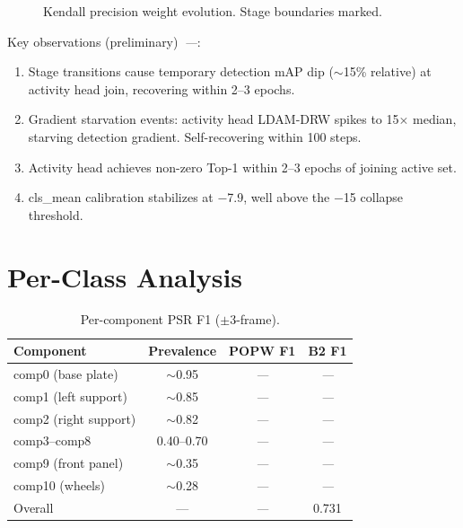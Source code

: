 \documentclass[10pt,journal,compsoc]{IEEEtran}
\newcommand{\popw}{POPW}
\newcommand{\todo}{\textit{---}}
\newcommand{\popwres}{\todo}
\begin{document}
\begin{figure}[htbp]
\centering
{}
\caption{Kendall precision weight evolution. Stage boundaries marked.}
\label{fig:kendall-evolution}
\end{figure}

Key observations (preliminary)~\popwres:
\begin{enumerate}[nosep]
\item Stage transitions cause temporary detection mAP dip ($\sim$15\% relative) at activity head join, recovering within 2--3 epochs.
\item Gradient starvation events: activity head LDAM-DRW spikes to 15$\times$ median, starving detection gradient. Self-recovering within 100 steps.
\item Activity head achieves non-zero Top-1 within 2--3 epochs of joining active set.
\item cls\_mean calibration stabilizes at $-$7.9, well above the $-$15 collapse threshold.
\end{enumerate}

\FloatBarrier

\section{Per-Class Analysis}
\label{sec:per-class}

\begin{table}[htbp]
\centering
\small
\caption{Per-component PSR F1 ($\pm3$-frame).}
\label{tab:per-class-psr}
\begin{tabular}{l c c c}
\toprule
\textbf{Component} & \textbf{Prevalence} & \textbf{\popw{} F1} & \textbf{B2 F1} \\
\midrule
comp0 (base plate) & $\sim$0.95 & \popwres & \popwres \\
comp1 (left support) & $\sim$0.85 & \popwres & \popwres \\
comp2 (right support) & $\sim$0.82 & \popwres & \popwres \\
comp3--comp8 & 0.40--0.70 & \popwres & \popwres \\
comp9 (front panel) & $\sim$0.35 & \popwres & \popwres \\
comp10 (wheels) & $\sim$0.28 & \popwres & \popwres \\
\midrule
Overall & --- & \popwres & 0.731 \\
\bottomrule
\end{tabular}
\end{table}
\end{document}
